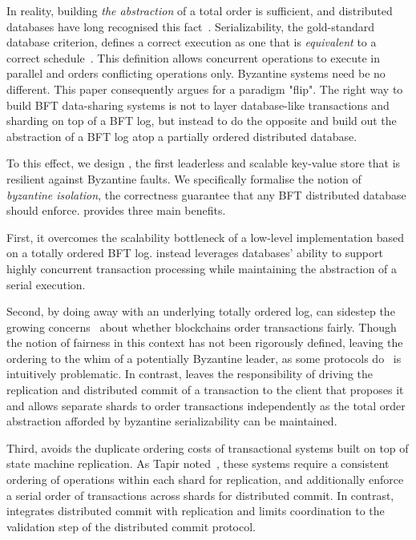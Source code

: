 In reality, building \textit{the abstraction} of a total order is sufficient, and distributed databases have long recognised this fact~\cite{}. Serializability, the gold-standard database criterion, defines a correct execution as one that is \textit{equivalent} to a correct schedule~\cite{}. This definition allows concurrent operations to execute in parallel and orders conflicting operations only.  Byzantine systems need be no different. This paper consequently argues for a paradigm "flip". The
right way to build BFT data-sharing systems is not to layer database-like transactions and sharding on top of a BFT log, but instead to do the opposite and build out the abstraction of a BFT log atop a partially ordered distributed database.

To this effect, we design \sys{}, the first leaderless and scalable key-value store that is resilient against
Byzantine faults. We specifically formalise the notion of \textit{byzantine isolation}, the correctness
guarantee that any BFT distributed database should enforce.  \sys{} provides three main benefits.

 First, it overcomes the scalability bottleneck of a low-level
implementation based on a totally ordered BFT log. \sys instead leverages databases' ability to support highly concurrent transaction
processing while maintaining the abstraction
of a serial execution.


Second, by doing away with an underlying totally ordered log, \sys{} can
sidestep the growing concerns~\cite{} about whether blockchains
order transactions fairly. Though the notion of fairness in this
context has not been rigorously defined, leaving the ordering to the
whim of a potentially Byzantine leader, as some protocols do~\cite{}
is intuitively problematic. In contrast, \sys leaves the
responsibility of driving the replication and distributed commit of a
transaction to the client that proposes it and allows separate 
shards to order transactions independently as the total order abstraction afforded by byzantine serializability can be maintained.

Third, \sys{} avoids the duplicate ordering costs of transactional systems
built on top of state machine replication. As Tapir noted~\cite{zhang2015tapir},
these systems require a consistent ordering of
operations within each shard for replication, and additionally enforce a serial order of transactions across
shards for distributed commit. In contrast, \sys{} integrates distributed commit with 
replication and
limits coordination to the validation step of the distributed commit
protocol.

